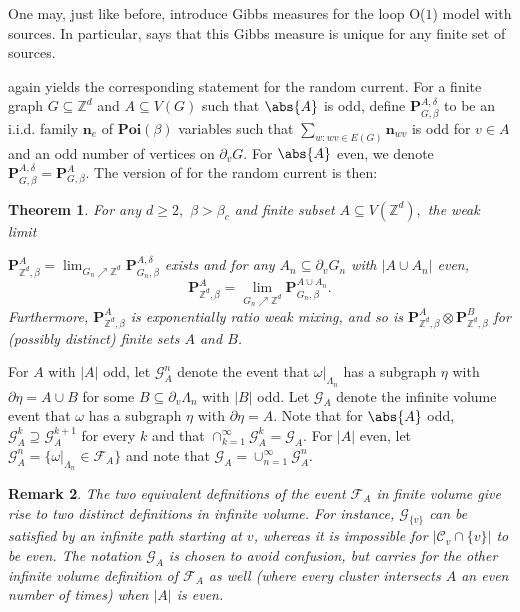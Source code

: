 \documentclass[article,11pt,reqno]{amsart}
\newcommand{\Z}{\mathbb{Z}}
\newcommand{\nn}{\mathbf{n}}
\newtheorem{theorem}{Theorem}[section]
\newtheorem{remark}[theorem]{Remark}
\begin{document}
One may, just like before, introduce Gibbs measures for the loop O($1$) model with sources. In particular,  says that this Gibbs measure is unique for any finite set of sources.

 again yields the corresponding statement for the random current. For a finite  graph $G\subseteq \Z^d$ and $A\subseteq V(G)$ such that $\abs{A}$ is odd, define $\mathbf{P}^{A,\delta}_{G,\beta}$ to be an i.i.d. family $\nn_e$ of $\mathbf{Poi}(\beta)$ variables such that $\sum_{w: wv\in E(G)} \nn_{wv}$ is odd for $v \in A$ and an odd number of vertices on $\partial_v G$. For $\abs{A}$ even, we denote $\mathbf{P}^{A,\delta}_{G,\beta}=\mathbf{P}^{A}_{G,\beta}$. The version of  for the random current is then:
\begin{theorem} \label{thm:Unique_cur_with_sources}
For any $d\geq 2,$ $\beta>\beta_c$  and finite subset $A\subseteq V(\mathbb{Z}^d),$ the weak limit

\noindent $\mathbf{P}^A_{\mathbb{Z}^d,\beta}=\lim_{G_n\nearrow \mathbb{Z}^d} \mathbf{P}^{A,\delta}_{G_n,\beta}$ exists and for any $A_n\subseteq \partial _vG_n$ with $|A\cup A_n|$ even, 
$$
\mathbf{P}^A_{\mathbb{Z}^d,\beta}=\lim_{G_n\nearrow \mathbb{Z}^d}\mathbf{P}^{A\cup A_n}_{G_n,\beta}.
$$
Furthermore, $\mathbf{P}^A_{\mathbb{Z}^d,\beta}$ is exponentially ratio weak mixing, and so is $\mathbf{P}^A_{\mathbb{Z}^d,\beta}\otimes \mathbf{P}^B_{\mathbb{Z}^d,\beta}$ for (possibly distinct) finite sets $A$ and $B$.
\end{theorem}
 For $A$ with $|A|$ odd, let $\mathcal{G}^n_{A}$ denote the event that $\omega|_{\Lambda_n}$ has a subgraph $\eta$ with $\partial \eta=A\cup B$ for some $B\subseteq \partial_v \Lambda_n$ with $|B|$ odd. Let $\mathcal{G}_{A}$ denote the infinite volume event that $\omega$ has a subgraph $\eta$ with $\partial \eta=A$. Note that for $\abs{A}$ odd, $\mathcal{G}^k_A\supseteq \mathcal{G}^{k+1}_A$ for every $k$ and that $\cap_{k=1}^{\infty} \mathcal{G}^k_A=\mathcal{G}_A.$ For $|A|$ even, let $\mathcal{G}^n_{A}= \{\omega\vert_{\Lambda_n} \in \mathcal{F}_A\}$ and note that 
 $\mathcal{G}_A=\cup_{n=1}^{\infty} \mathcal{G}^{n}_A.$ 

\begin{remark}
The two equivalent definitions of the event $\mathcal{F}_A$ in finite volume give rise to two distinct definitions in infinite volume. For instance, $\mathcal{G}_{\{v\}}$ can be satisfied by an infinite path starting at $v$, whereas it is impossible for $|\mathcal{C}_v\cap \{v\}|$ to be even. The notation $\mathcal{G}_A$ is chosen to avoid confusion, but  carries for the other infinite volume definition of $\mathcal{F}_A$ as well (where every cluster intersects $A$ an even number of times) when $|A|$ is even. 
\end{remark}
\end{document}
